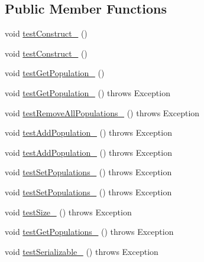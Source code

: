 \subsection*{Public Member Functions}
\begin{DoxyCompactItemize}
\item 
void \hyperlink{classorg_1_1jgap_1_1eval_1_1_population_history_test_acf0068b8e76925262b488b2bd7b32bf8}{test\-Construct\-\_} ()
\item 
void \hyperlink{classorg_1_1jgap_1_1eval_1_1_population_history_test_acaef6eed7dd5e7b9774ff5ff85eea827}{test\-Construct\-\_} ()
\item 
void \hyperlink{classorg_1_1jgap_1_1eval_1_1_population_history_test_a01b4fa7a9a8dc5b70a48b537c5272930}{test\-Get\-Population\-\_} ()
\item 
void \hyperlink{classorg_1_1jgap_1_1eval_1_1_population_history_test_a7a0f6c503c779545a75bffb5f857c205}{test\-Get\-Population\-\_} ()  throws Exception 
\item 
void \hyperlink{classorg_1_1jgap_1_1eval_1_1_population_history_test_a00c88c9ffc3ddd6e52a3f2b62b9cf921}{test\-Remove\-All\-Populations\-\_} ()  throws Exception 
\item 
void \hyperlink{classorg_1_1jgap_1_1eval_1_1_population_history_test_ab6ef5d60b30b305491818e0e25b95362}{test\-Add\-Population\-\_} ()  throws Exception 
\item 
void \hyperlink{classorg_1_1jgap_1_1eval_1_1_population_history_test_ae35fa6c728e78e14e5d0ddfc068f7f13}{test\-Add\-Population\-\_} ()  throws Exception 
\item 
void \hyperlink{classorg_1_1jgap_1_1eval_1_1_population_history_test_acac105d6a02d82bbfc1d517032d7f01f}{test\-Set\-Populations\-\_} ()  throws Exception 
\item 
void \hyperlink{classorg_1_1jgap_1_1eval_1_1_population_history_test_ad8fa83213873c8e36f87aa60ada75820}{test\-Set\-Populations\-\_} ()  throws Exception 
\item 
void \hyperlink{classorg_1_1jgap_1_1eval_1_1_population_history_test_a2e82681f981091d1d02ada9f90c876e1}{test\-Size\-\_} ()  throws Exception 
\item 
void \hyperlink{classorg_1_1jgap_1_1eval_1_1_population_history_test_a7669c28e961e5158433d9994ec98048a}{test\-Get\-Populations\-\_} ()  throws Exception 
\item 
void \hyperlink{classorg_1_1jgap_1_1eval_1_1_population_history_test_a17459e6ffc57badcb5dc77e5f7ef6a5b}{test\-Serializable\-\_} ()  throws Exception 
\end{DoxyCompactItemize}
